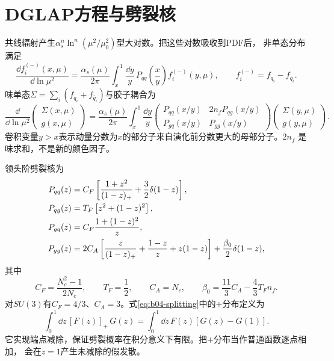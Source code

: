 \section{DGLAP方程与劈裂核}

共线辐射产生$\alpha_s^n\ln^n(\mu^2/\mu_0^2)$型大对数。把这些对数吸收到PDF后，
非单态分布满足
\begin{equation}
  \frac{\dd f_i^{(-)}(x,\mu)}{\dd\ln\mu^2}
  =\frac{\alpha_s(\mu)}{2\pi}
  \int_x^1\frac{\dd y}{y}\,P_{qq}\!\left(\frac{x}{y}\right)
  f_i^{(-)}(y,\mu),
  \qquad f_i^{(-)}=f_{q_i}-f_{\bar q_i}.
  \label{eq:b04-dglap-nonsinglet}
\end{equation}
味单态$\Sigma=\sum_i(f_{q_i}+f_{\bar q_i})$与胶子耦合为
\begin{equation}
  \frac{\dd}{\dd\ln\mu^2}
  \begin{pmatrix}\Sigma(x,\mu)\\g(x,\mu)\end{pmatrix}
  =\frac{\alpha_s(\mu)}{2\pi}
  \int_x^1\frac{\dd y}{y}
  \begin{pmatrix}
    P_{qq}(x/y)&2n_fP_{qg}(x/y)\\
    P_{gq}(x/y)&P_{gg}(x/y)
  \end{pmatrix}
  \begin{pmatrix}\Sigma(y,\mu)\\g(y,\mu)\end{pmatrix}.
  \label{eq:b04-dglap-singlet}
\end{equation}
卷积变量$y>x$表示动量分数为$x$的部分子来自演化前分数更大的母部分子。$2n_f$
是味求和，不是新的颜色因子。

领头阶劈裂核为
\begin{align}
  P_{qq}(z)&=C_F\left[\frac{1+z^2}{(1-z)_+}
  +\frac32\delta(1-z)\right],\notag\\
  P_{qg}(z)&=T_F\left[z^2+(1-z)^2\right],\notag\\
  P_{gq}(z)&=C_F\frac{1+(1-z)^2}{z},\notag\\
  P_{gg}(z)&=2C_A\left[\frac{z}{(1-z)_+}
  +\frac{1-z}{z}+z(1-z)\right]
  +\frac{\beta_0}{2}\delta(1-z),
  \label{eq:b04-splitting}
\end{align}
其中
\begin{equation}
  C_F=\frac{N_c^2-1}{2N_c},\qquad T_F=\frac12,\qquad C_A=N_c,
  \qquad \beta_0=\frac{11}{3}C_A-\frac43T_Fn_f .
  \label{eq:b04-color}
\end{equation}
对$SU(3)$有$C_F=4/3$、$C_A=3$。式\eqref{eq:b04-splitting}中的$+$分布定义为
\begin{equation}
  \int_0^1\dd z\,[F(z)]_+\,G(z)
  =\int_0^1\dd z\,F(z)[G(z)-G(1)].
  \label{eq:b04-plus}
\end{equation}
它实现端点减除，保证劈裂概率在积分意义下有限。把$+$分布当作普通函数逐点相加，
会在$z=1$产生未减除的假发散。

